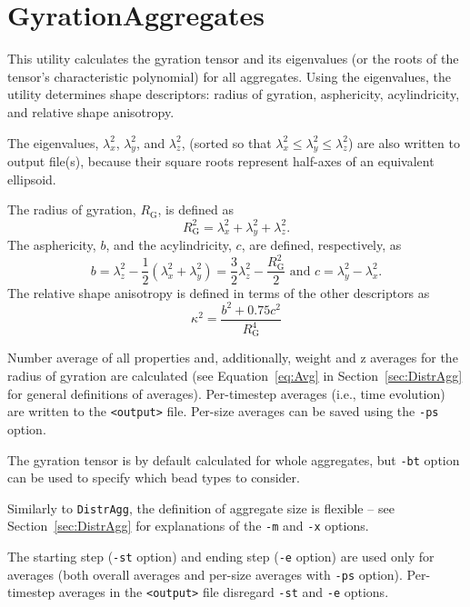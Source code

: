 \section{GyrationAggregates} \label{sec:GyrationAggregates}

This utility calculates the gyration tensor and its eigenvalues (or the
roots of the tensor's characteristic polynomial) for all aggregates. Using
the eigenvalues, the utility determines shape descriptors:
radius of gyration, asphericity, acylindricity, and relative shape
anisotropy.

The eigenvalues, $\lambda_x^2$, $\lambda_y^2$, and $\lambda_z^2$, (sorted
so that $\lambda_x^2\leq\lambda_y^2\leq\lambda_z^2$) are also written to
output file(s), because their square roots represent half-axes of an
equivalent ellipsoid.

The radius of gyration, $R_{\mathrm{G}}$, is defined as
\begin{equation} \label{eq:R_G}
  R_{\mathrm{G}}^2 = \lambda_x^2 + \lambda_y^2 + \lambda_z^2.
\end{equation}
The asphericity, $b$, and the acylindricity, $c$, are defined,
respectively, as
\begin{equation} \label{eq:b}
  b= \lambda_z^2 - \frac{1}{2}(\lambda_x^2 + \lambda_y^2) =
    \frac{3}{2}\lambda_z^2 - \frac{R_{\mathrm{G}}^2}{2}
  \mbox{ \ \ and \ \ }
  c = \lambda_y^2 - \lambda_x^2.
\end{equation}
The relative shape anisotropy is defined in terms of the other descriptors
as
\begin{equation} \label{eq:anis}
  \kappa^2 = \frac{b^2 + 0.75 c^2}{R_{\mathrm{G}}^4}
\end{equation}

Number average of all properties and, additionally, weight and z averages
for the radius of gyration are calculated (see Equation~\eqref{eq:Avg} in
Section~\ref{sec:DistrAgg} for general definitions of averages).
Per-timestep averages (i.e., time evolution) are written to the
\texttt{<output>} file. Per-size averages can be saved using the
\texttt{-ps} option.

The gyration tensor is by default calculated for whole aggregates, but
\texttt{-bt} option can be used to specify which bead types to consider.

Similarly to \texttt{DistrAgg}, the definition of aggregate size is
flexible -- see Section~\ref{sec:DistrAgg} for explanations of the
\texttt{-m} and \texttt{-x} options.

The starting step (\texttt{-st} option) and ending step (\texttt{-e}
option) are used only for averages (both overall averages and per-size
averages with \texttt{-ps} option). Per-timestep averages in the
\texttt{<output>} file disregard \texttt{-st} and \texttt{-e} options.

